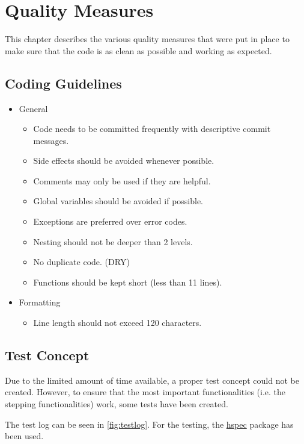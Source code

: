 \chapter{Quality Measures}

This chapter describes the various quality measures that were put in place to make sure that the code is as clean as possible and working as expected.

\section{Coding Guidelines}

\begin{itemize}
    \item General
    \begin{itemize}
        \item Code needs to be committed frequently with descriptive commit messages.
        \item Side effects should be avoided whenever possible.
        \item Comments may only be used if they are helpful.
        \item Global variables should be avoided if possible.
        \item Exceptions are preferred over error codes.
        \item Nesting should not be deeper than 2 levels.
        \item No duplicate code. (DRY)
        \item Functions should be kept short (less than 11 lines).
    \end{itemize}
    \item Formatting
    \begin{itemize}
        \item Line length should not exceed 120 characters.
    \end{itemize}
\end{itemize}

\section{Test Concept}

Due to the limited amount of time available, a proper test concept could not be created.
However, to ensure that the most important functionalities (i.e. the stepping functionalities) work,
some tests have been created.

The test log can be seen in \ref*{fig:testlog}.
For the testing, the \href{https://hackage.haskell.org/package/hspec}{hspec} package has been used.

